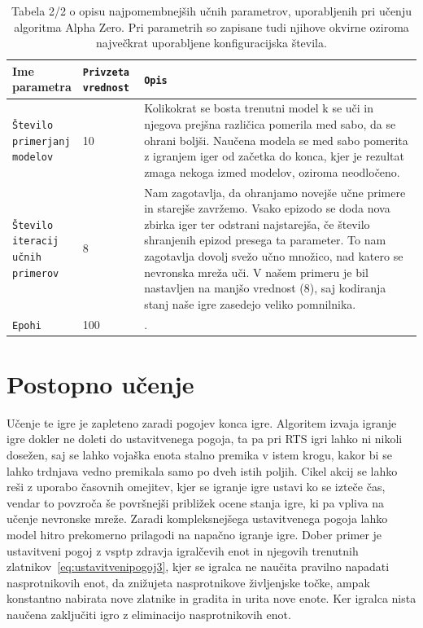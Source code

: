 \documentclass[a4paper, 12pt]{book}
\begin{document}
\begin{table}
	\begin{center}
		\begin{tabular}{p{0.15\linewidth}|p{0.15\linewidth}|p{0.7\linewidth}}
			Ime parametra                             & {\tt Privzeta vrednost} & {\tt Opis} \\ \hline

			{\tt Število primerjanj modelov}  		  & 10 						& Kolikokrat se bosta trenutni model k se uči in njegova prejšna različica pomerila med sabo, da se ohrani boljši.
																				  Naučena modela se med sabo pomerita z igranjem iger od začetka do konca, kjer je rezultat zmaga nekoga izmed modelov, oziroma neodločeno.\\
			{\tt Število iteracij učnih primerov}     & 8 						& Nam zagotavlja, da ohranjamo novejše učne primere in starejše zavržemo.
																				  Vsako epizodo se doda nova zbirka iger ter odstrani najstarejša, če število shranjenih epizod presega ta parameter.
																				  To nam zagotavlja dovolj svežo učno množico, nad katero se nevronska mreža uči.
																				  V našem primeru je bil nastavljen na manjšo vrednost (8), saj kodiranja stanj naše igre zasedejo veliko pomnilnika.\\
			{\tt Epohi}     						  & 100 					& .\\
		\end{tabular}
	\end{center}
	\caption{Tabela 2/2 o opisu najpomembnejših učnih parametrov, uporabljenih pri učenju algoritma Alpha Zero. Pri parametrih so zapisane tudi njihove okvirne oziroma največkrat uporabljene konfiguracijska števila.}
	\label{tableParameters2}
\end{table}



\section{Postopno učenje}
Učenje te igre je zapleteno zaradi pogojev konca igre. 
Algoritem izvaja igranje igre dokler ne doleti do ustavitvenega pogoja, ta pa pri RTS igri lahko ni nikoli dosežen, saj se lahko vojaška enota stalno premika v istem krogu, kakor bi se lahko trdnjava vedno premikala samo po dveh istih poljih.
Cikel akcij se lahko reši z uporabo časovnih omejitev, kjer se igranje igre ustavi ko se izteče čas, vendar to povzroča še površnejši približek ocene stanja igre, ki pa vpliva na učenje nevronske mreže.
Zaradi kompleksnejšega ustavitvenega pogoja lahko model hitro prekomerno prilagodi na napačno igranje igre.
Dober primer je ustavitveni pogoj z vsptp zdravja igralčevih enot in njegovih trenutnih zlatnikov~\ref{eq:ustavitvenipogoj3}, kjer se igralca ne naučita pravilno napadati nasprotnikovih enot, da znižujeta nasprotnikove življenjske točke, ampak konstantno nabirata nove zlatnike in gradita in urita nove enote.
Ker igralca nista naučena zaključiti igro z eliminacijo nasprotnikovih enot.
\end{document}
